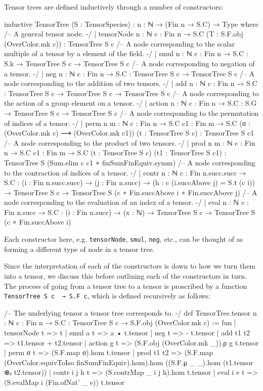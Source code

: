 \documentclass[a4paper, 11pt]{article}
\DeclareRobustCommand{\myinline}{\lstinline}
\begin{document}
Tensor trees are defined inductively through a number of constructors: 
\begin{codeLong}
inductive TensorTree (S : TensorSpecies) : {n : ℕ} → (Fin n → S.C) → Type where
  /-- A general tensor node. -/
  | tensorNode {n : ℕ} {c : Fin n → S.C} (T : S.F.obj (OverColor.mk c)) : TensorTree S c
  /-- A node corresponding to the scalar multiple of a tensor by a element of the field. -/
  | smul {n : ℕ} {c : Fin n → S.C} : S.k → TensorTree S c → TensorTree S c
  /-- A node corresponding to negation of a tensor. -/
  | neg {n : ℕ} {c : Fin n → S.C} : TensorTree S c → TensorTree S c
  /-- A node corresponding to the addition of two tensors. -/
  | add {n : ℕ} {c : Fin n → S.C} : TensorTree S c → TensorTree S c → TensorTree S c
  /-- A node corresponding to the action of a group element on a tensor. -/
  | action {n : ℕ} {c : Fin n → S.C} : S.G → TensorTree S c → TensorTree S c
  /-- A node corresponding to the permutation of indices of a tensor. -/
  | perm {n m : ℕ} {c : Fin n → S.C} {c1 : Fin m → S.C}
      (σ : (OverColor.mk c) ⟶ (OverColor.mk c1)) (t : TensorTree S c) : TensorTree S c1
  /-- A node corresponding to the product of two tensors. -/
  | prod {n m : ℕ} {c : Fin n → S.C} {c1 : Fin m → S.C}
    (t : TensorTree S c) (t1 : TensorTree S c1) : TensorTree S (Sum.elim c c1 ∘ finSumFinEquiv.symm)
  /-- A node corresponding to the contraction of indices of a tensor. -/
  | contr {n : ℕ} {c : Fin n.succ.succ → S.C} : (i : Fin n.succ.succ) →
    (j : Fin n.succ) → (h : c (i.succAbove j) = S.τ (c i)) → TensorTree S c →
    TensorTree S (c ∘ Fin.succAbove i ∘ Fin.succAbove j)
  /-- A node corresponding to the evaluation of an index of a tensor. -/
  | eval {n : ℕ} {c : Fin n.succ → S.C} : (i : Fin n.succ) → (x : ℕ) → TensorTree S c →
    TensorTree S (c ∘ Fin.succAbove i)
\end{codeLong}
Each constructor here, e.g. \myinline|tensorNode|, \myinline|smul|, \myinline|neg|, etc., can 
be thought of as forming a different type of node in a tensor tree.

Since the interpretation of each of the constructors is down to how we turn them into a tensor,
we discuss this before outlining each of the constructors in turn. The process 
of going from a tensor tree to a tensor is proscribed by a function
\myinline|TensorTree S c  → S.F c|, which is defined recursively as follows: 
\begin{code}
/-- The underlying tensor a tensor tree corresponds to. -/
def TensorTree.tensor {n : ℕ} {c : Fin n → S.C} : TensorTree S c → S.F.obj (OverColor.mk c) := fun
  | tensorNode t => t
  | smul a t => a • t.tensor
  | neg t => - t.tensor
  | add t1 t2 => t1.tensor + t2.tensor
  | action g t => (S.F.obj (OverColor.mk _)).ρ g t.tensor
  | perm σ t => (S.F.map σ).hom t.tensor
  | prod t1 t2 => (S.F.map (OverColor.equivToIso finSumFinEquiv).hom).hom
    ((S.F.μ _ _).hom (t1.tensor ⊗ₜ t2.tensor))
  | contr i j h t => (S.contrMap _ i j h).hom t.tensor
  | eval i e t => (S.evalMap i (Fin.ofNat' _ e)) t.tensor
\end{code}
\end{document}
